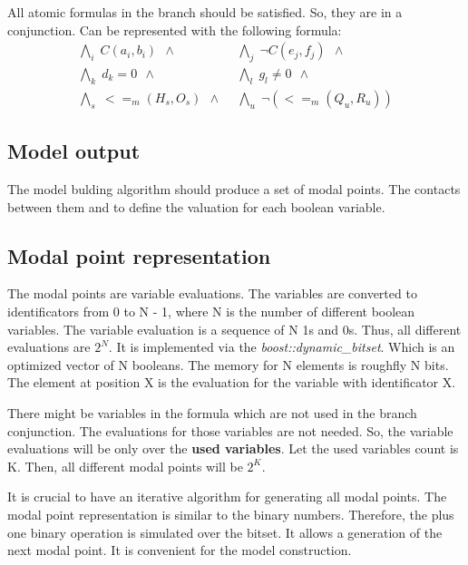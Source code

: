 \documentclass{article}
\begin{document}
	All atomic formulas in the branch should be satisfied. So, they are in a conjunction. Can be represented with the following formula:
	\begin{align*}
		\bigwedge\nolimits_{i} \; C(a_i, b_i) \:\: \wedge \:\: &
		\bigwedge\nolimits_{j} \; \neg C(e_j, f_j) \:\: \wedge \:\: \\
		\bigwedge\nolimits_{k} \; d_k = 0 \:\: \wedge \:\: &
		\bigwedge\nolimits_{l} \; g_l \neq 0 \:\: \wedge \:\: \\
		\bigwedge\nolimits_{s} \; <=_m(H_s, O_s) \:\: \wedge \:\: &
		\bigwedge\nolimits_{u} \; \neg (<=_m(Q_u, R_u) )
	\end{align*}

	\subsection*{Model output}
	\label{tableau:branch:output}
	The model bulding algorithm should produce a set of modal points. The contacts between them and to define the valuation for each boolean variable.

	\subsection{Modal point representation}
	The modal points are variable evaluations. The variables are converted to  identificators from 0 to N - 1, where N is the number of different boolean variables. The variable evaluation is a sequence of N 1s and 0s. Thus, all different evaluations are $2^N$. It is implemented via the \textit{boost::dynamic\_bitset}. Which is an optimized vector of N booleans. The memory for N elements is roughfly N bits. The element at position X is the evaluation for the variable with identificator X. 

	There might be variables in the formula which are not used in the branch conjunction. The evaluations for those variables are not needed. So, the variable evaluations will be only over the \textbf{used variables}. Let the used variables count is K. Then, all different modal points will be $2^K$.

	It is crucial to have an iterative algorithm for generating all modal points. The modal point representation is similar to the binary numbers. Therefore, the plus one binary operation is simulated over the bitset. It allows a generation of the next modal point. It is convenient for the model construction.
\end{document}
